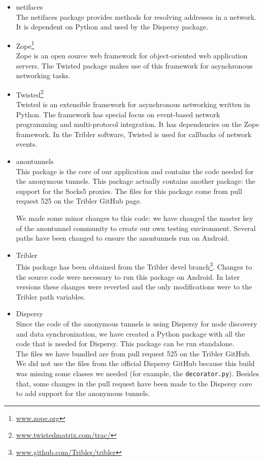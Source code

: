 \begin{itemize}
			\item netifaces\\
			The netifaces package provides methods for resolving addresses in a network. It is dependent on Python and used by the Dispersy package.
		
			\item Zope\footnote{\href{http://www.zope.org/}{www.zope.org}}\\
			Zope is an open source web framework for object-oriented web application servers. The Twisted package makes use of this framework for asynchronous networking tasks.
		
			\item Twisted\footnote{\href{https://twistedmatrix.com/trac/}{www.twistedmatrix.com/trac/}}\\
			Twisted is an extensible framework for asynchronous networking written in Python. The framework has special focus on event-based network programming and multi-protocol integration. It has dependencies on the Zope framework. In the Tribler software, Twisted is used for callbacks of network events.
		
			\item anontunnels\\
			This package is the core of our application and contains the code needed for the anonymous tunnels. This package actually contains another package: the support for the Socks5 proxies. The files for this package come from pull request 525 on the Tribler GitHub page.
			
			We made some minor changes to this code: we have changed the master key of the anontunnel community to create our own testing environment. Several paths have been changed to ensure the anontunnels run on Android.
			
			\item Tribler\\
			This package has been obtained from the Tribler devel branch\footnote{\href{https://github.com/Tribler/tribler}{www.github.com/Tribler/tribler}}. Changes to the source code were necessary to run this package on Android. In later versions these changes were reverted and the only modifications were to the Tribler path variables.
			
			\item Dispersy\\
			Since the code of the anonymous tunnels is using Dispersy for node discovery and data synchronization, we have created a Python package with all the code that is needed for Dispersy. This package can be run standalone.\\
			The files we have bundled are from pull request 525 on the Tribler GitHub. We did not use the files from the official Dispersy GitHub because this build was missing some classes we needed (for example, the \texttt{decorator.py}). Besides that, some changes in the pull request have been made to the Dispersy core to add support for the anonymous tunnels.
		
		\end{itemize}
	
